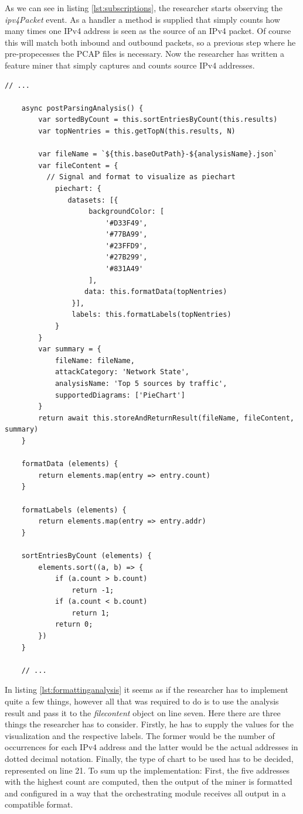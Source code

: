As we can see in listing \ref{lst:subscriptions}, the researcher starts observing the \textit{ipv4Packet} event. As a handler a method is supplied that simply counts how many times one IPv4 address is seen as the source of an IPv4 packet. Of course this will match both inbound and outbound packets, so a previous step where he pre-propecesses the PCAP files is necessary. Now the researcher has written a feature miner that simply captures and counts source IPv4 addresses.

\begin{lstlisting}[caption={Initial content of the newly create Miner},label={lst:formattinganalysis}]
    // ...
    
    async postParsingAnalysis() {
        var sortedByCount = this.sortEntriesByCount(this.results)
        var topNentries = this.getTopN(this.results, N)
 
        var fileName = `${this.baseOutPath}-${analysisName}.json`
        var fileContent = {
          // Signal and format to visualize as piechart
            piechart: {
               datasets: [{
                    backgroundColor: [
                        '#D33F49',
                        '#77BA99',
                        '#23FFD9',
                        '#27B299',
                        '#831A49'
                    ],
                   data: this.formatData(topNentries)
                }],
                labels: this.formatLabels(topNentries)
            }
        }
        var summary = {
            fileName: fileName,
            attackCategory: 'Network State',
            analysisName: 'Top 5 sources by traffic',
            supportedDiagrams: ['PieChart']
        }
        return await this.storeAndReturnResult(fileName, fileContent, summary)
    }
 
    formatData (elements) {
        return elements.map(entry => entry.count)
    }
 
    formatLabels (elements) {
        return elements.map(entry => entry.addr)
    }
  
    sortEntriesByCount (elements) {
        elements.sort((a, b) => {
            if (a.count > b.count)
                return -1;
            if (a.count < b.count)
                return 1;
            return 0;
        })
    }
    
    // ...

\end{lstlisting}
In listing \ref{lst:formattinganalysis} it seems as if the researcher has to implement quite a few things, however all that was required to do is to use the analysis result and pass it to the \textit{filecontent} object on line seven. Here there are three things the researcher has to consider. Firstly, he has to supply the values for the visualization and the respective labels. The former would be the number of occurrences for each IPv4 address and the latter would be the actual addresses in dotted decimal notation. Finally, the type of chart to be used has to be decided, represented on line 21. To sum up the implementation: First, the five addresses with the highest count are computed, then the output of the miner is formatted and configured in a way that the orchestrating module receives all output in a compatible format.
